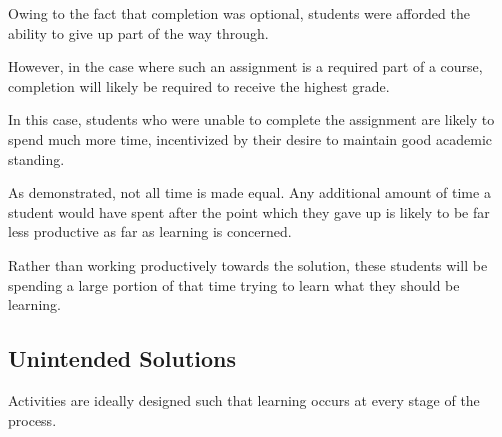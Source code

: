         Owing to the fact that completion was optional, students were afforded the ability to give up part of the way through. %







However, in the case where such an assignment is a required part of a course, completion will likely be required to receive the highest grade. %







In this case, students who were unable to complete the assignment are likely to spend much more time, incentivized by their desire to maintain good academic standing. %







As \citeauthor{Z-Zeng} demonstrated, not all time is made equal. Any additional amount of time a student would have spent after the point which they gave up is likely to be far less productive as far as learning is concerned. %







Rather than working productively towards the solution, these students will be spending a large portion of that time trying to learn what they should be learning.















                                







    \subsection{Unintended Solutions}







        Activities are ideally designed such that learning occurs at every stage of the process. %







